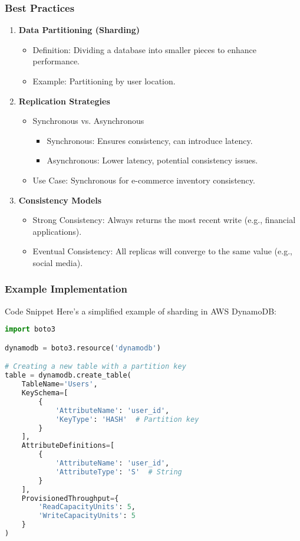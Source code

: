 \documentclass[aspectratio=169]{beamer}
\begin{document}
\begin{frame}[fragile]
    \frametitle{Best Practices}
    \begin{enumerate}
        \item \textbf{Data Partitioning (Sharding)}
        \begin{itemize}
            \item Definition: Dividing a database into smaller pieces to enhance performance.
            \item Example: Partitioning by user location.
        \end{itemize}

        \item \textbf{Replication Strategies}
        \begin{itemize}
            \item Synchronous vs. Asynchronous
            \begin{itemize}
                \item Synchronous: Ensures consistency, can introduce latency.
                \item Asynchronous: Lower latency, potential consistency issues.
            \end{itemize}
            \item Use Case: Synchronous for e-commerce inventory consistency.
        \end{itemize}
        
        \item \textbf{Consistency Models}
        \begin{itemize}
            \item Strong Consistency: Always returns the most recent write (e.g., financial applications).
            \item Eventual Consistency: All replicas will converge to the same value (e.g., social media).
        \end{itemize}
    \end{enumerate}
\end{frame}

\begin{frame}
    \frametitle{Example Implementation}
    \begin{block}{Code Snippet}
        Here’s a simplified example of sharding in AWS DynamoDB:
        \begin{lstlisting}[language=Python]
import boto3

dynamodb = boto3.resource('dynamodb')

# Creating a new table with a partition key
table = dynamodb.create_table(
    TableName='Users',
    KeySchema=[
        {
            'AttributeName': 'user_id',
            'KeyType': 'HASH'  # Partition key
        }
    ],
    AttributeDefinitions=[
        {
            'AttributeName': 'user_id',
            'AttributeType': 'S'  # String
        }
    ],
    ProvisionedThroughput={
        'ReadCapacityUnits': 5,
        'WriteCapacityUnits': 5
    }
)
        \end{lstlisting}
    \end{block}
\end{frame}
\end{document}
